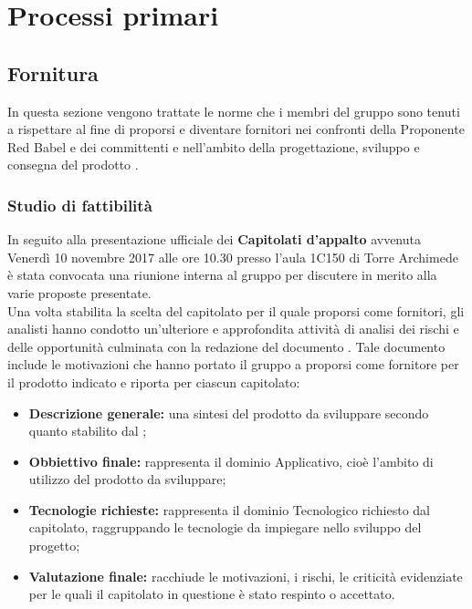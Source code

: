 \documentclass[NormeDiProgetto.tex]{subfiles}
\begin{document}
\chapter{Processi primari}
\section{Fornitura}
In questa sezione vengono trattate le norme che i membri del gruppo \gruppo sono tenuti a rispettare al fine di proporsi e diventare fornitori nei confronti della Proponente Red Babel e dei committenti \Vardanega e \Cardin nell'ambito della progettazione, sviluppo e consegna del prodotto \progetto.




\subsection{Studio di fattibilità}
In seguito alla presentazione ufficiale dei \textbf{Capitolati d'appalto} avvenuta Venerdì 10 novembre 2017 alle ore 10.30 presso l'aula 1C150 di Torre Archimede è stata convocata una riunione interna al gruppo per discutere in merito alla varie proposte presentate.\\
Una volta stabilita la scelta del capitolato per il quale proporsi come fornitori, gli analisti hanno condotto un'ulteriore e approfondita attività di analisi dei rischi e delle opportunità culminata con la redazione del documento \sdf \vruno. Tale documento include le motivazioni che hanno portato il gruppo \gruppo a proporsi come fornitore per il prodotto indicato e riporta per ciascun capitolato:
\begin{itemize}
	\item \textbf{Descrizione generale:} una sintesi del prodotto da sviluppare secondo quanto stabilito dal ;
	\item \textbf{Obbiettivo finale:} rappresenta il dominio Applicativo, cioè l'ambito di utilizzo del prodotto da sviluppare;
	\item \textbf{Tecnologie richieste:} rappresenta il dominio Tecnologico richiesto dal capitolato, raggruppando le tecnologie da impiegare nello sviluppo del progetto;
	\item \textbf{Valutazione finale:} racchiude le motivazioni, i rischi, le criticità evidenziate per le quali il capitolato in questione è stato respinto o accettato.
\end{itemize}
\end{document}
